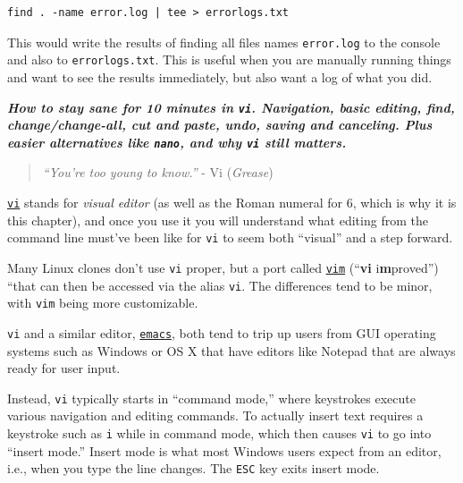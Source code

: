 \documentclass[10pt,]{book}
\numberwithin{figure}{chapter}
\begin{document}
\begin{verbatim}
find . -name error.log | tee > errorlogs.txt
\end{verbatim}

This would write the results of finding all files names
\texttt{error.log} to the console and also to \texttt{errorlogs.txt}.
This is useful when you are manually running things and want to see the
results immediately, but also want a log of what you did.


\textbf{\emph{How to stay sane for 10 minutes in \texttt{vi}.
Navigation, basic editing, find, change/change-all, cut and paste, undo,
saving and canceling. Plus easier alternatives like \texttt{nano}, and
why \texttt{vi} still matters.}}

\begin{quote}
\emph{``You're too young to know.''} - Vi (\emph{Grease})
\end{quote}

\href{http://linux.die.net/man/1/vi}{\texttt{vi}} stands for
\emph{visual editor} (as well as the Roman numeral for 6, which is why
it is this chapter), and once you use it you will understand what
editing from the command line must've been like for \texttt{vi} to seem
both ``visual'' and a step forward.

Many Linux clones don't use \texttt{vi} proper, but a port called
\href{http://www.vim.org/}{\texttt{vim}} (``\textbf{vi}
i\textbf{m}proved'') ``that can then be accessed via the alias
\texttt{vi}. The differences tend to be minor, with \texttt{vim} being
more customizable.

\texttt{vi} and a similar editor,
\href{http://linux.die.net/man/1/emacs}{\texttt{emacs}}, both tend to
trip up users from GUI operating systems such as Windows or OS X that
have editors like Notepad that are always ready for user input.

Instead, \texttt{vi} typically starts in ``command mode,'' where
keystrokes execute various navigation and editing commands. To actually
insert text requires a keystroke such as \texttt{i} while in command
mode, which then causes \texttt{vi} to go into ``insert mode.'' Insert
mode is what most Windows users expect from an editor, i.e., when you
type the line changes. The \texttt{ESC} key exits insert mode.
\end{document}
